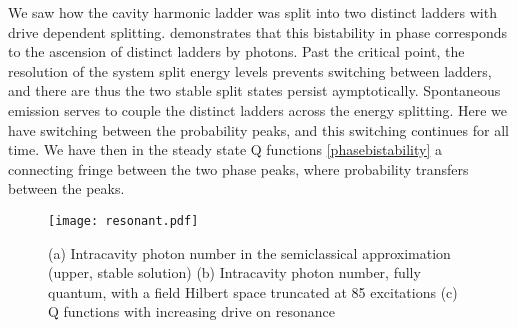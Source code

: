 We saw how the cavity harmonic ladder was split into two distinct ladders with drive dependent splitting. 
\cite{Carmichael2015} demonstrates that this bistability in phase corresponds to the ascension of distinct ladders by photons. 
Past the critical point, the resolution of the system split energy levels prevents switching between ladders, and there are thus the two stable split states persist aymptotically. 
Spontaneous emission serves to couple the distinct ladders across the energy splitting. 
Here we have switching between the probability peaks, and this switching continues for all time. 
We have then in the steady state Q functions \cref{phasebistability} a connecting fringe between the two phase peaks, where probability transfers between the peaks. 
\begin{figure*}[htb]
    \texttt{[image: resonant.pdf]}
    \caption{(a) Intracavity photon number in the semiclassical approximation (upper, stable solution) (b) Intracavity photon number, fully quantum, with a field Hilbert space truncated at 85 excitations (c) Q functions with increasing drive on resonance}
    \label{resonant}
\end{figure*}
